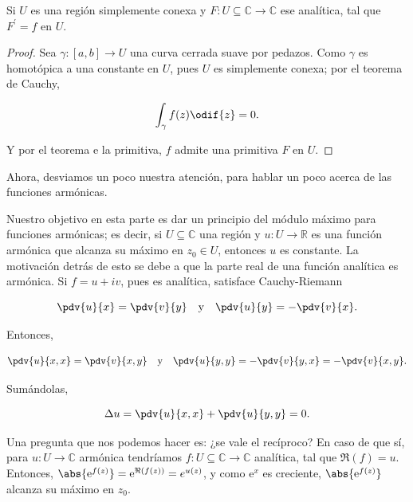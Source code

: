 \documentclass[../main.tex]{subfiles}
\begin{document}
\begin{corollary}
    Si \(U\) es una región simplemente conexa y \(F \colon U \subseteq \mathbb{C} \to
    \mathbb{C}\) ese analítica, tal que \(F^{\prime} = f\) en \(U\).
\end{corollary}

\begin{proof}
    Sea \(\gamma \colon [a, b] \to U\) una curva cerrada suave por pedazos. Como
    \(\gamma\) es homotópica a una constante en \(U\), pues \(U\) es simplemente conexa;
    por el teorema de Cauchy,

    \begin{equation*}
        \int_{\gamma}^{}f(z)\odif{z} = 0.
    \end{equation*}

    Y por el teorema e la primitiva, \(f\) admite una primitiva \(F\) en \(U\).
\end{proof}

Ahora, desviamos un poco nuestra atención, para hablar un poco acerca de las funciones
armónicas.

Nuestro objetivo en esta parte es dar un principio del módulo máximo para funciones
armónicas; es decir, si \(U \subseteq \mathbb{C}\) una región y \(u \colon U \to
\mathbb{R}\) es una función armónica que alcanza su máximo en \(z_{0}\in  U\), entonces
\(u\) es constante.
La motivación detrás de esto se debe a que la parte real de una función analítica es
armónica. Si \(f = u + iv\), pues es analítica, satisface Cauchy-Riemann

\begin{equation*}
    \pdv{u}{x} = \pdv{v}{y}\quad \text{y}\quad \pdv{u}{y} = - \pdv{v}{x}.
\end{equation*}

Entonces,

\begin{equation*}
    \pdv{u}{x,x} = \pdv{v}{x,y}\quad \text{y}\quad \pdv{u}{y,y} = - \pdv{v}{y,x} = -
    \pdv{v}{x,y}.
\end{equation*}

Sumándolas,

\begin{equation*}
    \Delta{u} = \pdv{u}{x,x} + \pdv{u}{y,y} = 0.
\end{equation*}

Una pregunta que nos podemos hacer es: ¿se vale el recíproco? En caso de que sí,  para
\(u \colon U \to \mathbb{C}\) armónica tendríamos \(f \colon U \subseteq \mathbb{C} \to
\mathbb{C}\) analítica, tal que \(\Re(f) = u\). Entonces, \(\abs{\mathrm{e}^{f(z)}} =
\mathrm{e}^{\Re(f(z))} = e^{u(z)}\), y como \(\mathrm{e}^{x}\) es creciente,
\(\abs{\mathrm{e}^{f(z)}}\) alcanza su máximo en \(z_{0}\).
\end{document}
